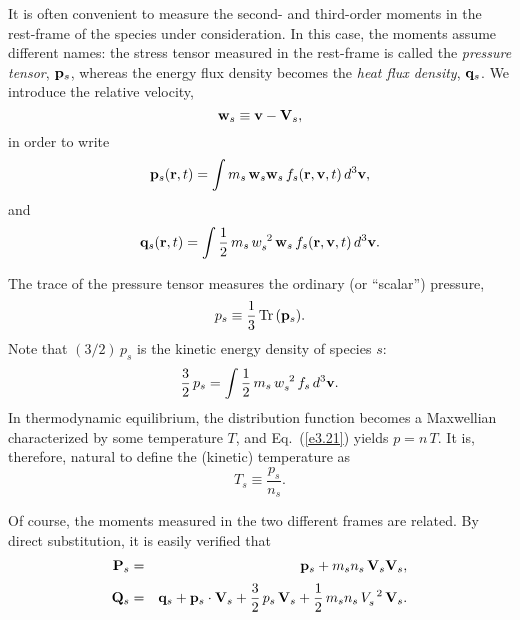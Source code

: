 It is often convenient to measure the second- and third-order moments in the rest-frame of the species under consideration. In this case, the
moments assume different names: the stress tensor measured in the rest-frame
is called the {\em pressure tensor}, ${\bf p}_s$, whereas the energy flux
density becomes the {\em heat flux density}, ${\bf q}_s$. We introduce the
relative velocity,
\begin{equation}
{\bf w}_s\equiv {\bf v} - {\bf V}_s,
\end{equation}
in order to write
\begin{equation}
{\bf p}_s({\bf r}, t) =  \int
m_s\,{\bf w}_s{\bf w}_s\, f_s({\bf r}, {\bf v},t)\,d^3{\bf v},
\end{equation}
and
\begin{equation}
{\bf q}_s({\bf r}, t) =  \int
\frac{1}{2}\,m_s\,w_s^{~2}\,{\bf w}_s\, f_s({\bf r}, {\bf v},t)\,d^3{\bf v}.
\end{equation}

The trace of the pressure tensor measures the ordinary (or ``scalar'') pressure,
\begin{equation}
p_s\equiv \frac{1}{3}\,{\rm Tr}\,({\bf p}_s).
\end{equation}
Note that $(3/2)\,p_s$ is the kinetic energy density of species $s$:
\begin{equation}\label{e3.21}
\frac{3}{2}\,p_s = \int \frac{1}{2}\,m_s\,w_s^{~2} \,f_s\,d^3{\bf v}.
\end{equation}
In thermodynamic equilibrium, the distribution function becomes a Maxwellian
characterized by some temperature $T$, and Eq.~(\ref{e3.21}) yields $p=n\,T$. It
is, therefore, natural to define the (kinetic) temperature as
\begin{equation}
T_s \equiv \frac{p_s}{n_s}.
\end{equation}

Of course, the moments measured in the two different frames are related.
By direct substitution, it is easily verified that
\begin{eqnarray}\label{e3.23a}
{\bf P}_s &=& {\bf p}_s + m_s n_s\,{\bf V}_s{\bf V}_s,\\[0.5ex]
{\bf Q}_s &=& {\bf q}_s + {\bf p}_s\cdot{\bf V}_s + \frac{3}{2}\,p_s\,{\bf V}_s
+\frac{1}{2}\,m_s n_s\,V_s^{~2}\, {\bf V}_s.\label{e3.23b}
\end{eqnarray}
 
